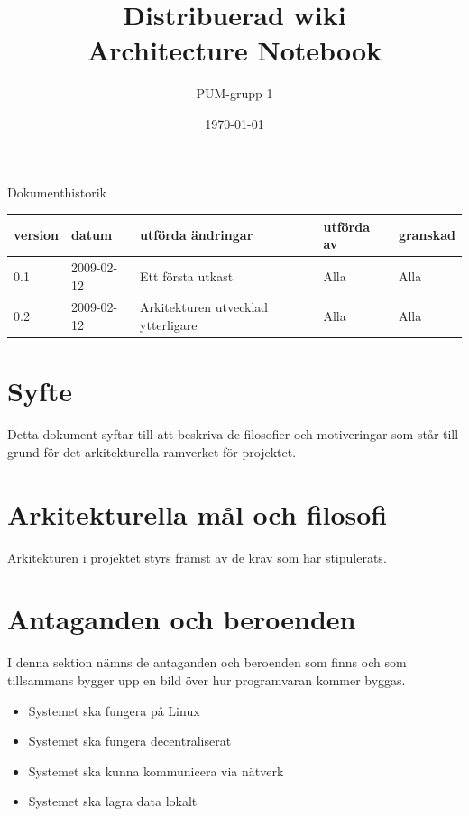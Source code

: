 

\ifpdf
\else
\fi

\title{Distribuerad wiki \\ Architecture Notebook}
\author{PUM-grupp 1}
\date{\today}



\maketitle

\thispagestyle{empty}

\newpage

{\centering \Large{Dokumenthistorik\\}}

\vspace{10pt}
\begin{tabularx}{\textwidth}{ |l|l|X|l|l| }
  \hline
    \textbf{version} & \textbf{datum} & \textbf{utförda ändringar} & \textbf{utförda av} & \textbf{granskad} \\
	\hline 
  0.1 & 2009-02-12 &  Ett första utkast  & Alla & Alla   \\
	\hline 
  0.2 & 2009-02-12 &  Arkitekturen utvecklad ytterligare  & Alla & Alla   \\
  \hline
\end{tabularx}

\newpage

\setcounter{tocdepth}{2}
\tableofcontents
\newpage

\section{Syfte}
Detta dokument syftar till att beskriva de filosofier och motiveringar som står till grund för det arkitekturella ramverket för projektet.
\section{Arkitekturella mål och filosofi}
Arkitekturen i projektet styrs främst av de krav som har stipulerats.
\section{Antaganden och beroenden}
I denna sektion nämns de antaganden och beroenden som finns och som tillsammans bygger upp en bild över hur programvaran kommer byggas.
\begin{itemize}
\item Systemet ska fungera på Linux
\item Systemet ska fungera decentraliserat
\item Systemet ska kunna kommunicera via nätverk
\item Systemet ska lagra data lokalt
\end{itemize}
